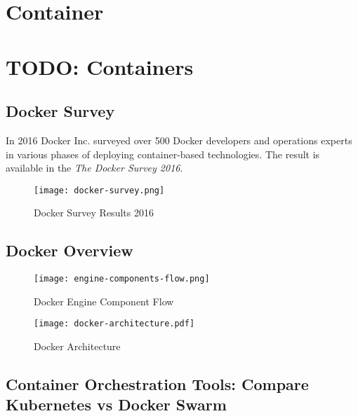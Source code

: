 \chapter{Container}

\FILENAME

\chapter{TODO: Containers}\label{pi-cluster-form-factor}

\section{Docker Survey}

In 2016 Docker Inc. surveyed over 500 Docker developers and operations
experts in various phases of deploying container-based
technologies. The result is available in the \textit{The Docker Survey
  2016}.


\begin{figure}[htb]
\centering
\texttt{[image: docker-survey.png]}
\caption{Docker Survey Results 2016
}
\end{figure}


\section{Docker Overview}



\begin{figure}[htb]
\centering
\texttt{[image: engine-components-flow.png]}
\caption{ Docker Engine Component Flow }
\end{figure}

\begin{figure}[htb]
\centering
\texttt{[image: docker-architecture.pdf]}
\caption{ Docker Architecture }
\end{figure}



\section{Container Orchestration Tools: Compare Kubernetes vs Docker Swarm}


